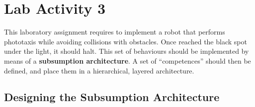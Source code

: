 \section{Lab Activity 3}

This laboratory assignment requires to implement a robot that performs
phototaxis while avoiding collisions with obstacles. Once reached the black
spot under the light, it should halt. This set of behaviours should be
implemented by means of a \textbf{subsumption architecture}. A set of
``competences'' should then be defined, and place them in a hierarchical,
layered architecture.

\subsection{Designing the Subsumption Architecture}\label{ssec:subsum}

